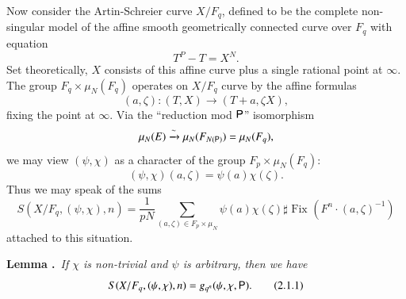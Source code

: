 Now consider the Artin-Schreier curve $X/F_{q}$, defined to be the complete non-singular model of the affine smooth geometrically connected curve over $F_{q}$ with equation
$$
T^{P}-T=X^{N}.
$$
Set theoretically, $X$ consists of this affine curve plus a single rational point at $\infty$. The group $F_{q}\times \mu_{N}(F_{q})$ operates on $X/F_{q}$ curve by the affine formulas
$$
(a,\zeta):(T,X)\to (T+a,\zeta X),
$$
fixing the point at $\infty$. Via the ``reduction mod $\mathsf{P}$'' isomorphism
$$
\mu_{N}(E)\xrightarrow{\sim}\mu_{N}(F_{N(\mathsf{P})})=\mu_{N}(F_{q}),
$$
we may view $(\psi,\chi)$ as a character of the group $F_{p}\times \mu_{N}(F_{q})$:
$$
(\psi,\chi)(a,\zeta)=\psi(a)\chi(\zeta).
$$
Thus we may speak of the sums
$$
S(X/F_{q},(\psi,\chi),n)=\frac{1}{pN}\sum\limits_{(a,\zeta)\in F_{p}\times \mu_{N}}\psi(a)\chi(\zeta)\sharp \text{~Fix~} (F^{n}\cdot (a,\zeta)^{-1})
$$
attached to this situation.

\medskip
\noindent
{\bf Lemma .\label{art6-lem2.1}}~{\em If $\chi$ is non-trivial and $\psi$ is arbitrary, then we have}
\begin{equation*}
S(X/F_{q},(\psi,\chi),n)=g_{q^{n}}(\psi,\chi,\mathsf{P}).\tag{2.1.1}\label{art6-eq2.1.1}
\end{equation*}

